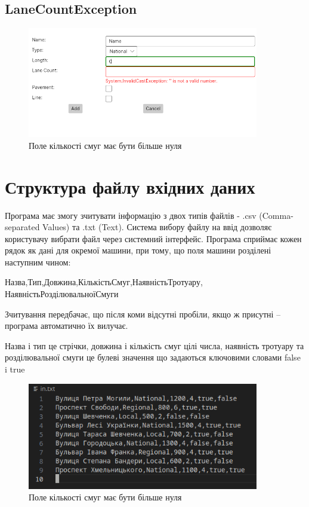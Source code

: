 \documentclass[14pt]{extarticle}
\begin{document}
\subsection{LaneCountException}
\begin{figure}[H]
    \centering
    \includegraphics[width=0.90\textwidth]{lane_exception.png}
    \caption{Поле кількості смуг має бути більше нуля}
\end{figure}

\section{Структура файлу вхідних даних}
Програма має змогу зчитувати інформацію з двох типів файлів - .csv (Comma-separated Values) та .txt (Text). Система вибору файлу на ввід дозволяє користувачу вибрати файл через системний інтерфейс. Програма сприймає кожен рядок як дані для окремої машини, при тому, що поля машини розділені наступним чином:

Назва,Тип,Довжина,КількістьСмуг,НаявністьТротуару, НаявністьРозділювальноїСмуги

Зчитування передбачає, що після коми відсутні пробіли, якщо ж присутні – програма автоматично їх вилучає.

Назва і тип це стрічки, довжина і кількість смуг цілі числа, наявність тротуару та розділювальної смуги це булеві значення що задаються ключовими словами false i true

\begin{figure}[H]
    \centering
    \includegraphics[width=0.90\textwidth]{csv}
    \caption{Поле кількості смуг має бути більше нуля}
\end{figure}
\end{document}
